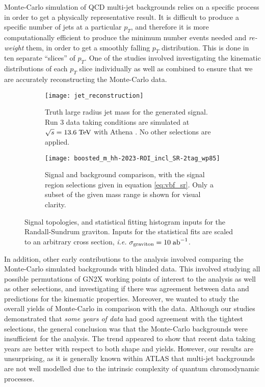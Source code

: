 \documentclass[12pt]{article}
\begin{document}
Monte-Carlo simulation of QCD multi-jet backgrounds relies on a specific process
in order to get a physically representative result. It is difficult to produce a
specific number of jets at a particular $p_T$, and therefore it is more
computationally efficient to produce the minimum number events needed and
\textit{re-weight} them, in order to get a smoothly falling $p_T$ distribution.
This is done in ten separate ``slices'' of $p_T$. One of the studies involved
investigating the kinematic distributions of each $p_T$ slice individually as
well as combined to ensure that we are accurately reconstructing the Monte-Carlo
data.

\begin{figure}[t]
    \centering
    \begin{subfigure}[t]{.48\textwidth}
        \centering
        \texttt{[image: jet\_reconstruction]}
        \caption{Truth large radius jet mass for the generated signal. Run 3
        data taking conditions are simulated at $\sqrt{s}=13.6\;\text{TeV}$ with
        Athena \cite{atlas_simulation}. No other selections are applied.}
        \label{subfig:jet_reconstruction}
    \end{subfigure}
    \hfill
    \begin{subfigure}[t]{.48\textwidth}
        \centering
        \texttt{[image: boosted\_m\_hh-2023-ROI\_incl\_SR-2tag\_wp85]}
        \caption{Signal and background comparison, with the signal region
        selections given in equation \ref{eq:vbf_sr}. Only a subset of the given
        mass range is shown for visual clarity.}
        \label{subfig:input_hists}
    \end{subfigure}
    \caption{Signal topologies, and statistical fitting histogram inputs for the
    Randall-Sundrum graviton. Inputs for the statistical fits are scaled to an
    arbitrary cross section, \textit{i.e.}
    $\sigma_{\text{graviton}}=10\;\text{ab}^{-1}$.}
\label{fig:my_contributions}
\end{figure}

In addition, other early contributions to the analysis involved comparing the
Monte-Carlo simulated backgrounds with blinded data. This involved studying all
possible permutations of GN2X working points of interest to the analysis as well
as other selections, and investigating if there was agreement between data and
predictions for the kinematic properties. Moreover, we wanted to study the
overall yields of Monte-Carlo in comparison with the data. Although our studies
demonstrated that \textit{some years of data} had good agreement with the
tightest selections, the general conclusion was that the Monte-Carlo backgrounds
were insufficient for the analysis. The trend appeared to show that recent data
taking years are better with respect to both shape and yields. However, our
results are unsurprising, as it is generally known within ATLAS that multi-jet
backgrounds are not well modelled due to the intrinsic complexity of quantum
chromodynamic processes.
\end{document}
